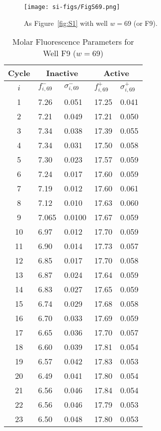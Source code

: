                 \begin{figure}
                    \centering
                    \texttt{[image: si-figs/FigS69.png]}
                    \caption{
                        As Figure~\ref{fig:S1} with well $w=69$ (or F9).
                    }
                \end{figure}
                \clearpage
    \begin{table}
        \caption{Molar Fluorescence Parameters for Well F9 ($w=69$)}
        \centering
        \begin{tabular}{c|ll|ll}
            Cycle & \multicolumn{2}{c|}{Inactive} & \multicolumn{2}{c}{Active} \\
            \hline
            $i$ & $f_{i,69}^{-}$ & $\sigma_{i,69}^{-}$ &  $f_{i,69}^{+}$ & $\sigma_{i,69}^{+}$ \\
            \hline
    1 & 7.26 & 0.051 & 17.25 & 0.041 \\
2 & 7.21 & 0.049 & 17.21 & 0.050 \\
3 & 7.34 & 0.038 & 17.39 & 0.055 \\
4 & 7.34 & 0.031 & 17.50 & 0.058 \\
5 & 7.30 & 0.023 & 17.57 & 0.059 \\
6 & 7.24 & 0.017 & 17.60 & 0.059 \\
7 & 7.19 & 0.012 & 17.60 & 0.061 \\
8 & 7.12 & 0.010 & 17.63 & 0.060 \\
9 & 7.065 & 0.0100 & 17.67 & 0.059 \\
10 & 6.97 & 0.012 & 17.70 & 0.059 \\
11 & 6.90 & 0.014 & 17.73 & 0.057 \\
12 & 6.85 & 0.017 & 17.70 & 0.058 \\
13 & 6.87 & 0.024 & 17.64 & 0.059 \\
14 & 6.83 & 0.027 & 17.65 & 0.059 \\
15 & 6.74 & 0.029 & 17.68 & 0.058 \\
16 & 6.70 & 0.033 & 17.69 & 0.059 \\
17 & 6.65 & 0.036 & 17.70 & 0.057 \\
18 & 6.60 & 0.039 & 17.81 & 0.054 \\
19 & 6.57 & 0.042 & 17.83 & 0.053 \\
20 & 6.49 & 0.041 & 17.80 & 0.054 \\
21 & 6.56 & 0.046 & 17.84 & 0.054 \\
22 & 6.56 & 0.046 & 17.79 & 0.053 \\
23 & 6.50 & 0.048 & 17.80 & 0.053 \\

\end{tabular}
\end{table}

